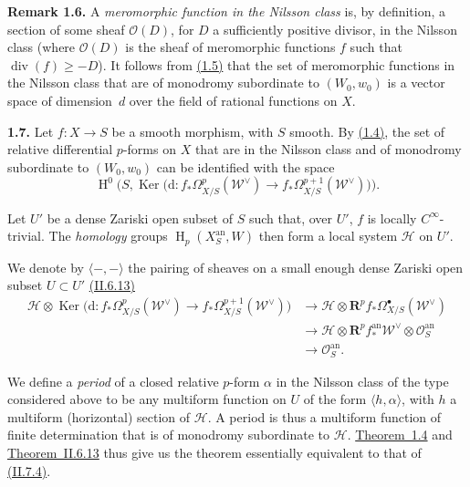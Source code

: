 \documentclass{report}
\newenvironment{rmenv}[1]
  {\phantomsection\par\medskip\noindent\textbf{#1.}\rmfamily}
  {\medskip}
\newcommand{\scr}[1]{{\mathscr{#1}}}
\renewcommand{\cal}[1]{{\mathcal{#1}}}
\newcommand{\dd}{\mathrm{d}}
\newcommand{\RR}{\mathbf{R}}
\newcommand{\an}{\mathrm{an}}
\renewcommand{\geq}{\geqslant}
\DeclareMathOperator{\Ker}{Ker}
\DeclareMathOperator{\HH}{H}
\newcommand{\oldpage}[1]{\marginpar{\footnotesize$\Big\vert$ \textit{p.~#1}}}
\begin{document}
\begin{rmenv}{Remark 1.6}
\label{III.1.6}
  A \emph{meromorphic function in the Nilsson class} is, by definition, a section of some sheaf $\cal{O}(D)$, for $D$ a sufficiently positive divisor, in the Nilsson class (where $\cal{O}(D)$ is the sheaf of meromorphic functions $f$ such that $\operatorname{div}(f)\geq-D$).
  It follows from \hyperref[III.1.5]{(1.5)} that the set of meromorphic functions in the Nilsson class that are of monodromy subordinate to $(W_0,w_0)$ is a vector space of dimension~$d$ over the field of rational functions on $X$.
\end{rmenv}

\begin{rmenv}{1.7}
\label{III.1.7}
  Let $f\colon X\to S$ be a smooth morphism, with $S$ smooth.
  By \hyperref[III.1.4]{(1.4)}, the set of relative differential $p$-forms on $X$ that are in the Nilsson class and of monodromy subordinate to $(W_0,w_0)$ can be identified with the space
  \[
    \HH^0\Big(
      S,\Ker\big(
      \dd\colon f_*\Omega_{X/S}^p(\scr{W}^\vee)\to f_*\Omega_{X/S}^{p+1}(\scr{W}^\vee)
      \big)
    \Big).
  \]

  Let $U'$ be a dense Zariski open subset of $S$ such that, over $U'$, $f$ is locally $C^\infty$-trivial.
  The \emph{homology} groups $\HH_p(X_S^\an,W)$ then form a local system $\scr{H}$ on $U'$.

  We denote by $\langle-,-\rangle$ the pairing of sheaves on a small enough dense Zariski open subset $U\subset U'$ \hyperref[II.6.13]{(II.6.13)}
  \[
    \begin{aligned}
      \scr{H} \otimes \Ker\big(\dd\colon f_*\Omega_{X/S}^p(\scr{W}^\vee)\to f_*\Omega_{X/S}^{p+1}(\scr{W}^\vee)\big)
      &\to \scr{H} \otimes \RR^p f_* \Omega_{X/S}^\bullet(\scr{W}^\vee)
    \\&\to \scr{H} \otimes \RR^p f_*^\an \scr{W}^\vee \otimes \cal{O}_S^\an
    \\&\to \cal{O}_S^\an.
    \end{aligned}
  \]

\oldpage{125}
  We define a \emph{period} of a closed relative $p$-form $\alpha$ in the Nilsson class of the type considered above to be any multiform function on $U$ of the form $\langle h,\alpha\rangle$, with $h$ a multiform (horizontal) section of $\scr{H}$.
  A period is thus a multiform function of finite determination that is of monodromy subordinate to $\scr{H}$.
  \hyperref[III.1.4]{Theorem~1.4} and \hyperref[II.6.13]{Theorem~II.6.13} thus give us the theorem essentially equivalent to that of \hyperref[II.7.4]{(II.7.4)}.
\end{rmenv}
\end{document}
